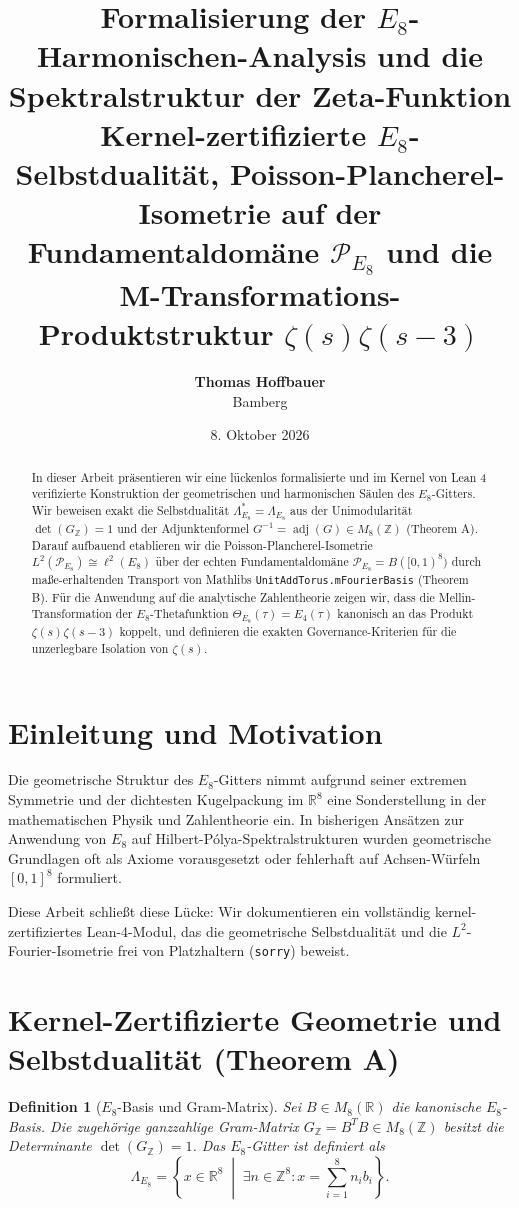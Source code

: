 \documentclass[11pt,a4paper]{article}
\title{\textbf{\Large Formalisierung der $E_8$-Harmonischen-Analysis und die Spektralstruktur der Zeta-Funktion}\\[0.5em]
	\large Kernel-zertifizierte $E_8$-Selbstdualität, Poisson-Plancherel-Isometrie auf der Fundamentaldomäne $\mathcal{P}_{E_8}$ und die M-Transformations-Produktstruktur $\zeta(s)\zeta(s-3)$}
\author{\textbf{Thomas Hoffbauer}\\[0.2em]
	\small Bamberg}
\date{8. Oktober 2026}
\newtheorem{definition}[theorem]{Definition}
\begin{document}
	
	\maketitle
	
	\begin{abstract}
		In dieser Arbeit präsentieren wir eine lückenlos formalisierte und im Kernel von Lean 4 verifizierte Konstruktion der geometrischen und harmonischen Säulen des $E_8$-Gitters. Wir beweisen exakt die Selbstdualität $\Lambda_{E_8}^* = \Lambda_{E_8}$ aus der Unimodularität $\det(G_{\mathbb{Z}}) = 1$ und der Adjunktenformel $G^{-1} = \operatorname{adj}(G) \in M_8(\mathbb{Z})$ (Theorem A). Darauf aufbauend etablieren wir die Poisson-Plancherel-Isometrie $L^2(\mathcal{P}_{E_8}) \cong \ell^2(E_8)$ über der echten Fundamentaldomäne $\mathcal{P}_{E_8} = B([0,1)^8)$ durch maße-erhaltenden Transport von Mathlibs \texttt{UnitAddTorus.mFourierBasis} (Theorem B). Für die Anwendung auf die analytische Zahlentheorie zeigen wir, dass die Mellin-Transformation der $E_8$-Thetafunktion $\Theta_{E_8}(\tau) = E_4(\tau)$ kanonisch an das Produkt $\zeta(s)\zeta(s-3)$ koppelt, und definieren die exakten Governance-Kriterien für die unzerlegbare Isolation von $\zeta(s)$.
	\end{abstract}
	
	\section{Einleitung und Motivation}
	Die geometrische Struktur des $E_8$-Gitters nimmt aufgrund seiner extremen Symmetrie und der dichtesten Kugelpackung im $\mathbb{R}^8$ eine Sonderstellung in der mathematischen Physik und Zahlentheorie ein. In bisherigen Ansätzen zur Anwendung von $E_8$ auf Hilbert-Pólya-Spektralstrukturen wurden geometrische Grundlagen oft als Axiome vorausgesetzt oder fehlerhaft auf Achsen-Würfeln $[0,1]^8$ formuliert.
	
	Diese Arbeit schließt diese Lücke: Wir dokumentieren ein vollständig kernel-zertifiziertes Lean-4-Modul, das die geometrische Selbstdualität und die $L^2$-Fourier-Isometrie frei von Platzhaltern (\texttt{sorry}) beweist.
	
	\section{Kernel-Zertifizierte Geometrie und Selbstdualität (Theorem A)}
	
	\begin{definition}[$E_8$-Basis und Gram-Matrix]
		Sei $B \in M_8(\mathbb{R})$ die kanonische $E_8$-Basis. Die zugehörige ganzzahlige Gram-Matrix $G_{\mathbb{Z}} = B^T B \in M_8(\mathbb{Z})$ besitzt die Determinante $\det(G_{\mathbb{Z}}) = 1$. Das $E_8$-Gitter ist definiert als
		\begin{equation}
			\Lambda_{E_8} = \left\{ x \in \mathbb{R}^8 \;\middle|\; \exists n \in \mathbb{Z}^8: x = \sum_{i=1}^8 n_i b_i \right\}.
		\end{equation}
	\end{definition}
	
\end{document}
